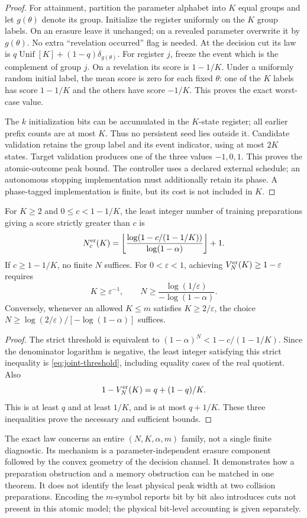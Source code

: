 \begin{proof}
For attainment, partition the parameter alphabet into $K$ equal groups
and let $g(\theta)$ denote its group. Initialize the register uniformly
on the $K$ group labels. On an erasure leave it unchanged; on a revealed
parameter overwrite it by $g(\theta)$. No extra ``revelation occurred''
flag is needed. At the decision cut its law is
$q\operatorname{Unif}[K]+(1-q)\delta_{g(\theta)}$.
For register $j$, freeze the event which is the complement of group $j$.
On a revelation its score is $1-1/K$. Under a uniformly random initial
label, the mean score is zero for each fixed $\theta$: one of the $K$
labels has score $1-1/K$ and the others have score $-1/K$.
This proves the exact worst-case value.

The $k$ initialization bits can be accumulated in the $K$-state register;
all earlier prefix counts are at most $K$. Thus no persistent seed lies
outside it. Candidate validation retains the group label and its event
indicator, using at most $2K$ states. Target validation produces one
of the three values $-1,0,1$. This proves the atomic-outcome peak bound.
The controller uses a declared external schedule; an autonomous stopping
implementation must additionally retain its phase. A phase-tagged
implementation is finite, but its cost is not included in $K$.
\end{proof}

\begin{corollary}
\label{cor:joint-scale}
For $K\ge2$ and $0\le c<1-1/K$, the least integer number of training
preparations giving a score strictly greater than $c$ is
\begin{equation}\label{eq:joint-threshold}
 N_c^{\rm er}(K)=
 \left\lfloor\frac{\log(1-c/(1-1/K))}{\log(1-\alpha)}\right\rfloor+1.
\end{equation}
If $c\ge1-1/K$, no finite $N$ suffices. For $0<\varepsilon<1$, achieving
$V_N^{\rm er}(K)\ge1-\varepsilon$ requires
\[
 K\ge\varepsilon^{-1},\qquad
 N\ge\frac{\log(1/\varepsilon)}{-\log(1-\alpha)}.
\]
Conversely, whenever an allowed $K\le m$ satisfies $K\ge2/\varepsilon$,
the choice
$N\ge\log(2/\varepsilon)/[-\log(1-\alpha)]$ suffices.
\end{corollary}
\begin{proof}
The strict threshold is equivalent to
$(1-\alpha)^N<1-c/(1-1/K)$. Since the denominator logarithm is
negative, the least integer satisfying this strict inequality is
\eqref{eq:joint-threshold}, including equality cases of the real
quotient. Also
\[
 1-V_N^{\rm er}(K)=q+(1-q)/K.
\]
This is at least $q$ and at least $1/K$, and is at most $q+1/K$.
These three inequalities prove the necessary and sufficient bounds.
\end{proof}

The exact law concerns an entire $(N,K,\alpha,m)$ family, not a single
finite diagnostic. Its mechanism is a parameter-independent erasure
component followed by the convex geometry of the decision channel.
It demonstrates how a preparation obstruction and a memory obstruction
can be matched in one theorem. It does not identify the least physical
peak width at two collision preparations. Encoding the $m$-symbol
reports bit by bit also introduces cuts not present in this atomic
model; the physical bit-level accounting is given separately.
